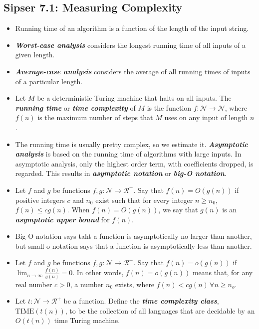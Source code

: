 \documentclass{article}
\begin{document}
\subsection{Sipser 7.1: Measuring Complexity}
\begin{itemize}
    \item Running time of an algorithm is a function of the length of the input string.
    \item \textbf{\textit{Worst-case analysis}} considers the longest running time of all inputs of a given length.
    \item \textbf{\textit{Average-case analysis}} considers the average of all running times of inputs of a particular length.
    \item Let $M$ be a deterministic Turing machine that halts on all inputs. The \textbf{\textit{running time}} or  \textbf{\textit{time complexity}} of $M$ is the function $f:\mathcal{N}\longrightarrow\mathcal{N}$, where $f(n)$ is the maximum number of steps that $M$ uses on any input of length $n$. 
    \item The running time is usually pretty complex, so we estimate it. \textbf{\textit{Asymptotic analysis}} is based on the running time of algorithms with large inputs. In asymptotic analysis, only the highest order term, with coefficients dropped, is regarded. This results in \textbf{\textit{asymptotic notation}} or \textbf{\textit{big-O notation}}.
    \item Let $f$ and $g$ be functions $f,g:\mathcal{N}\longrightarrow\mathcal{R}^+$. Say that $f(n)=O(g(n))$ if positive integers $c$ and $n_0$ exist such that for every integer $n\geq n_0$, $f(n)\leq c g(n)$. When $f(n)=O(g(n))$, we say that $g(n)$ is an \textbf{\textit{asymptotic upper bound}} for $f(n)$.
    \item Big-O notation says taht a function is asymptotically no larger than another, but small-o notation says that a function is asymptotically less than another.
    \item Let $f$ and $g$ be functions $f,g:\mathcal{N}\longrightarrow\mathcal{R}^+$. Say that $f(n)=o(g(n))$ if $\lim_{n\rightarrow\infty}\frac{f(n)}{g(n)}=0$. In other words, $f(n)=o(g(n))$ means that, for any real number $c>0$, a number $n_0$ exists, where $f(n)<cg(n)\,\forall n\geq n_o$.
    \item Let $t:\mathcal{N}\longrightarrow\mathcal{R}^+$ be a function. Define the \textbf{\textit{time complexity class}}, $\textrm{TIME}(t(n))$, to be the collection of all languages that are decidable by an $O(t(n))$ time Turing machine.
\end{itemize}
\end{document}
